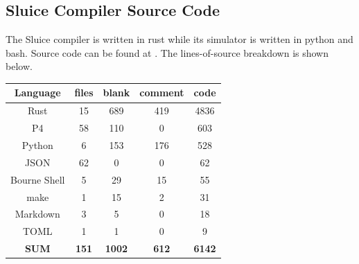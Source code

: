 \documentclass[12pt, oneside]{article}
\begin{document}
\subsection{Sluice Compiler Source Code} 

The Sluice compiler is written in rust while its simulator is written in python and bash. Source code can be found at \cite{sluiceSrc}. The lines-of-source breakdown is shown below.

\begin{center}
 \begin{tabular} {|c c c c c|} 
 \hline
 Language &  files & blank & comment & code  \\ [0.5ex] 
  \hline\hline
Rust &	15  & 689 & 419 &  4836\\
 \hline\hline
P4&	58 & 110 & 0 & 603 \\
 \hline
Python& 6 & 153 & 176 & 528 \\
 \hline
JSON&	62 & 0 & 0 & 62 \\
 \hline
Bourne Shell&	5 & 29 & 15 & 55 \\
 \hline
make & 1 & 15 & 2 & 31 \\
 \hline
Markdown & 3 & 5 & 0 & 18 \\
 \hline
TOML & 1 & 1 & 0 & 9 \\
 \hline
 \textbf{SUM} & \textbf{151} & \textbf{1002} & \textbf{612} & \textbf{6142} \\
 \hline
\end{tabular}
\end{center}


\newpage


\end{document}
